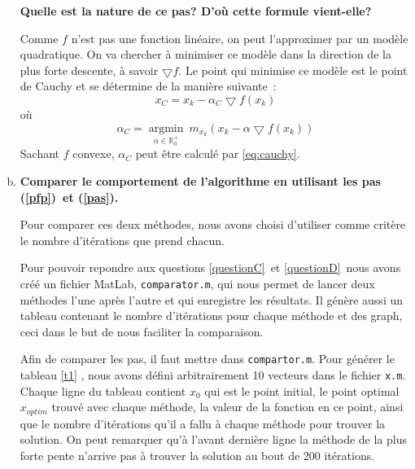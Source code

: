 \documentclass[11pt,a4paper,twoside,onecolumn,titlepage]{report}
\newcommand{\question}[1]{\textbf{#1}}
\begin{document}
\begin{enumerate}[(a)]
\question{Quelle est la nature de ce pas? D'où cette formule vient-elle?}

%
%



   
Comme $f$ n'est pas une fonction linéaire, on peut l'approximer par un modèle quadratique.
On va chercher à minimiser ce modèle dans la direction de la plus forte descente, à savoir $\bigtriangledown f$. Le point qui minimise ce modèle est le point de Cauchy et se détermine de la manière suivante~:
\begin{equation}
x_C = x_k - \alpha_C \bigtriangledown f(x_k)
\end{equation}
où
\begin{equation}
\alpha_C = \underset{\alpha \in \mathbb{R}^+_0}{\operatorname{argmin}}\ m_{x_k}(x_k-\alpha\bigtriangledown f(x_k))
\end{equation}
Sachant $f$ convexe, $\alpha_C$ peut être calculé par \eqref{eq:cauchy}.




%
%
%

\item\label{questionC} \question{Comparer le comportement de l'algorithme en utilisant les pas (\ref{pfp})\ et (\ref{pas}).}

%
%
Pour comparer ces deux méthodes, nous avons choisi d'utiliser comme critère le nombre d'itérations que prend chacun. 

Pour pouvoir repondre aux questions \ref{questionC}\ et \ref{questionD}\ nous avons créé un fichier MatLab, \texttt{comparator.m}, qui nous permet de lancer deux méthodes l'une après l'autre et qui enregistre les résultats. Il génère aussi un tableau contenant le nombre d'itérations pour chaque méthode et des graph, ceci dans le but de nous faciliter la comparaison.

Afin de comparer les pas, il faut mettre  dans \texttt{compartor.m}. Pour générer le tableau \ref{t1} , nous avons défini arbitrairement 10 vecteurs  dans le fichier \texttt{x.m}. Chaque ligne du tableau contient $x_0$ qui est le point initial, le point optimal $x_{optim}$ trouvé avec chaque méthode, la valeur de la fonction en ce point, ainsi que le nombre d'itérations qu'il a fallu à chaque méthode pour trouver la solution. On peut remarquer qu'à l'avant dernière ligne la méthode de la plus forte pente n'arrive pas à trouver la solution au bout de 200 itérations.


\end{enumerate}
\end{document}

